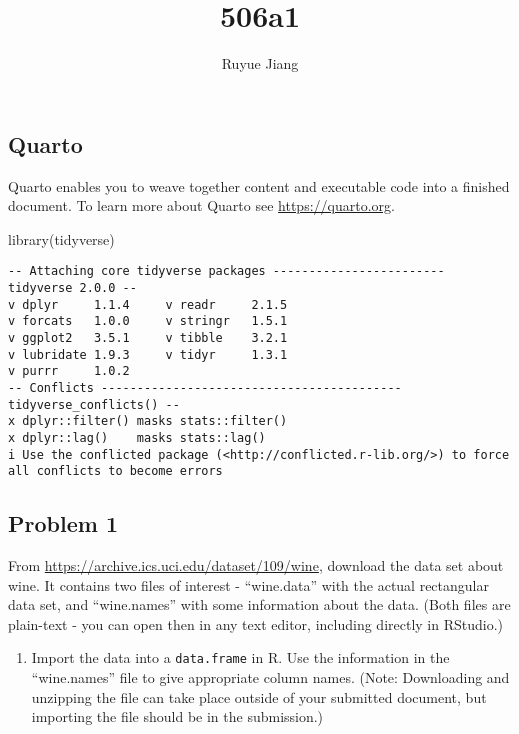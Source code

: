 \documentclass[
  letterpaper,
  DIV=11,
  numbers=noendperiod]{scrartcl}
\title{506a1}
\author{Ruyue Jiang}
\date{}
\newenvironment{Shaded}{\begin{snugshade}}{\end{snugshade}}
\newcommand{\FunctionTok}[1]{\textcolor[rgb]{0.28,0.35,0.67}{#1}}
\newcommand{\NormalTok}[1]{\textcolor[rgb]{0.00,0.23,0.31}{#1}}
\providecommand{\tightlist}{%
  \setlength{\itemsep}{0pt}\setlength{\parskip}{0pt}}\usepackage{longtable,booktabs,array}
\begin{document}
\maketitle

\subsection{Quarto}\label{quarto}

Quarto enables you to weave together content and executable code into a
finished document. To learn more about Quarto see
\url{https://quarto.org}.

\begin{Shaded}
\begin{Highlighting}[]
\FunctionTok{library}\NormalTok{(tidyverse)}
\end{Highlighting}
\end{Shaded}

\begin{verbatim}
-- Attaching core tidyverse packages ------------------------ tidyverse 2.0.0 --
v dplyr     1.1.4     v readr     2.1.5
v forcats   1.0.0     v stringr   1.5.1
v ggplot2   3.5.1     v tibble    3.2.1
v lubridate 1.9.3     v tidyr     1.3.1
v purrr     1.0.2     
-- Conflicts ------------------------------------------ tidyverse_conflicts() --
x dplyr::filter() masks stats::filter()
x dplyr::lag()    masks stats::lag()
i Use the conflicted package (<http://conflicted.r-lib.org/>) to force all conflicts to become errors
\end{verbatim}

\subsection{Problem 1}\label{problem-1}

From \url{https://archive.ics.uci.edu/dataset/109/wine}, download the
data set about wine. It contains two files of interest - ``wine.data''
with the actual rectangular data set, and ``wine.names'' with some
information about the data. (Both files are plain-text - you can open
then in any text editor, including directly in RStudio.)

\begin{enumerate}
\def\labelenumi{\alph{enumi}.}
\tightlist
\item
  Import the data into a \texttt{data.frame} in R. Use the information
  in the ``wine.names'' file to give appropriate column names. (Note:
  Downloading and unzipping the file can take place outside of your
  submitted document, but importing the file should be in the
  submission.)
\end{enumerate}
\end{document}
